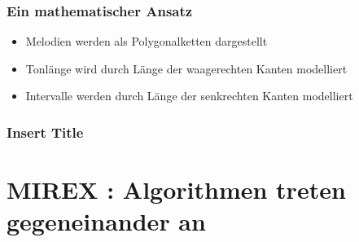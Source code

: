 \documentclass{beamer}
\begin{document}
	\begin{frame}
        \frametitle{Ein mathematischer Ansatz}
        \begin{minipage}{0.45\textwidth}
            \begin{itemize}
             \item Melodien werden als Polygonalketten dargestellt
             \item Tonlänge wird durch Länge der waagerechten Kanten modelliert
             \item Intervalle werden durch Länge der senkrechten Kanten modelliert 
            \end{itemize}
        \end{minipage}
        \begin{minipage}{0.45\textwidth}
        \end{minipage}
	\end{frame}

	\begin{frame}
        \frametitle{Insert Title}
	\end{frame}






	\section{MIREX : Algorithmen treten gegeneinander an}
\end{document}
